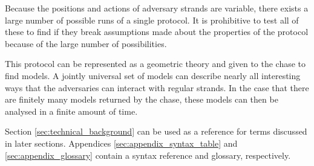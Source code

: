 		Because the positions and actions of adversary strands are variable,
		there exists a large number of possible runs of a single protocol. It
		is prohibitive to test all of these to find if they break assumptions
		made about the properties of the protocol because of the large number
		of possibilities.

		This protocol can be represented as a geometric theory and given to the
		chase to find models. A jointly universal set of models can describe
		nearly all interesting ways that the adversaries can interact with
		regular strands. In the case that there are finitely many models
		returned by the chase, these models can then be analysed in a finite
		amount of time.

	Section \ref{sec:technical_background} can be used as a reference for terms
	discussed in later sections. Appendices \ref{sec:appendix_syntax_table} and
	\ref{sec:appendix_glossary} contain a syntax reference and glossary,
	respectively.
